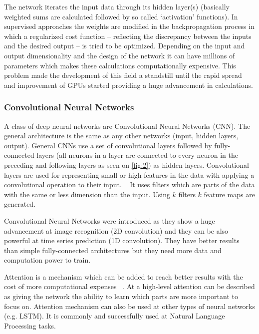 \documentclass[11pt,a4paper,oneside]{article}
\begin{document}

  The network iterates the input data through its hidden layer(s) (basically weighted sums are calculated followed by 
  so called ‘activation’ functions). In supervised approaches the weights are modified in the backpropagation process 
  in which a regularized cost function – reflecting the discrepancy between the inputs and the desired output – is tried 
  to be optimized. Depending on the input and output dimensionality and the design of the network it can have millions 
  of parameters which makes these calculations computationally expensive. This problem made the development of this 
  field a standstill until the rapid spread and improvement of GPUs started providing a huge advancement in 
  calculations.

  \subsubsection{Convolutional Neural Networks}
  \label{sec:conv_nets}

  A class of deep neural networks are Convolutional Neural Networks (CNN). The general architecture is the same as any 
  other networks (input, hidden layers, output). General CNNs use a set of convolutional layers followed by 
  fully-connected layers (all neurons in a layer are connected to every neuron in the preceding and following layers as 
  seen on \autoref{fig:2}) as hidden layers. Convolutional layers are used for representing small or high features in 
  the data with applying a convolutional operation to their input. ~\cite{cnn} It uses filters which are parts of the 
  data with the same or less dimension than the input. Using $k$ filters $k$ feature maps are generated. 

  Convolutional Neural Networks were introduced as they show a huge advancement at image recognition (2D convolution)
  and they can be also powerful at time series prediction (1D convolution). \cite{eval_conv_lstm} They have better 
  results than simple fully-connected architectures but they need more data and computation power to train.
  
  Attention is a mechanism which can be added to reach better results with the cost of more computational expenses 
  ~\cite{attention}. At a high-level attention can be described as giving the network the ability to learn which parts 
  are more important to focus on. Attention mechanism can also be used at other types of neural networks (e.g. LSTM). 
  It is commonly and successfully used at Natural Language Processing tasks.
\end{document}
